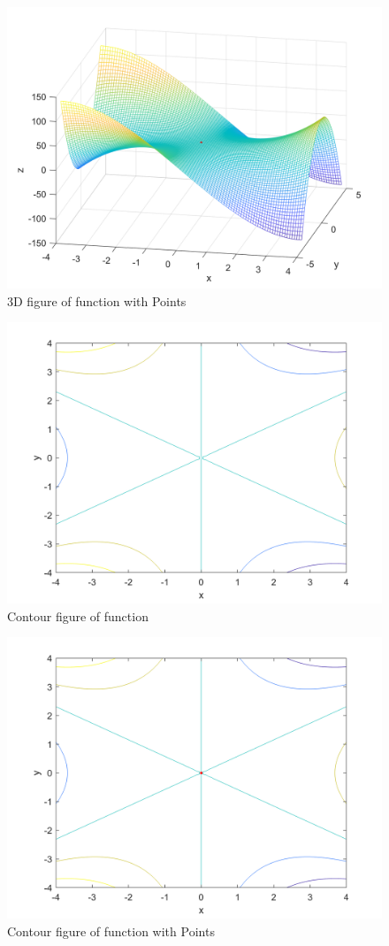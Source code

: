 \begin{figure}[H]
	\caption{3D figure of function with Points}
	\centering
	\includegraphics[width=12cm]{Q1/figures/3DplotWithPointsTashihQ1b.png}
\end{figure}

\begin{figure}[H]
	\caption{Contour figure of function}
	\centering
	\includegraphics[width=12cm]{Q1/figures/ContourQ1b.png}
\end{figure}
\begin{figure}[H]
	\caption{Contour figure of function with Points}
	\centering
	\includegraphics[width=12cm]{Q1/figures/ContourWithPointsQ1b.png}
\end{figure}
